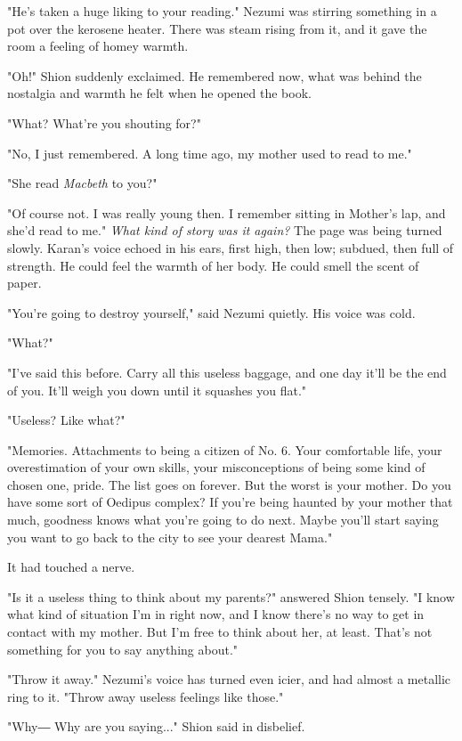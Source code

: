 "He's taken a huge liking to your reading." Nezumi was stirring
something in a pot over the kerosene heater. There was steam rising from
it, and it gave the room a feeling of homey warmth.

"Oh!" Shion suddenly exclaimed. He remembered now, what was behind the
nostalgia and warmth he felt when he opened the book.

"What? What're you shouting for?"

"No, I just remembered. A long time ago, my mother used to read to me."

"She read \emph{Macbeth} to you?"

"Of course not. I was really young then. I remember sitting in Mother's
lap, and she'd read to me." \emph{What kind of story was it again?} The page
was being turned slowly. Karan's voice echoed in his ears, first high,
then low; subdued, then full of strength. He could feel the warmth of
her body. He could smell the scent of paper.

"You're going to destroy yourself," said Nezumi quietly. His voice was
cold.

"What?"

"I've said this before. Carry all this useless baggage, and one day
it'll be the end of you. It'll weigh you down until it squashes you
flat."

"Useless? Like what?"

"Memories. Attachments to being a citizen of No. 6. Your comfortable
life, your overestimation of your own skills, your misconceptions of
being some kind of chosen one, pride. The list goes on forever. But the
worst is your mother. Do you have some sort of Oedipus complex? If
you're being haunted by your mother that much, goodness knows what
you're going to do next. Maybe you'll start saying you want to go back
to the city to see your dearest Mama."

It had touched a nerve.

"Is it a useless thing to think about my parents?" answered Shion
tensely. "I know what kind of situation I'm in right now, and I know
there's no way to get in contact with my mother. But I'm free to think
about her, at least. That's not something for you to say anything
about."

"Throw it away." Nezumi's voice has turned even icier, and had almost a
metallic ring to it. "Throw away useless feelings like those."

"Why― Why are you saying..." Shion said in disbelief.

